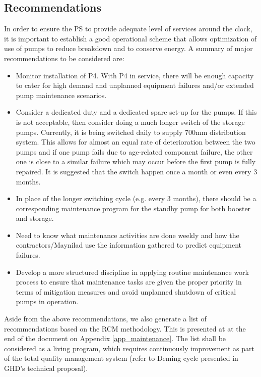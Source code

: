 \subsection{Recommendations}
In order to ensure the PS to provide adequate level of services around the clock, it is important to establish a good operational scheme that allows optimization of use of pumps to reduce breakdown and to conserve energy. A summary of major recommendations to be considered are:

\begin{itemize}

	\item Monitor installation of P4.  With P4 in service, there will be enough capacity to cater for high demand and unplanned equipment failures and/or extended pump maintenance scenarios.
	
	\item Consider a dedicated duty and a dedicated spare set-up for the pumps.  If this is not acceptable, then consider doing a much longer switch of the storage pumps.  Currently, it is being switched daily to supply 700mm distribution system.  This allows for almost an equal rate of deterioration between the two pumps and if one pump fails due to age-related component failure, the other one is close to a similar failure which may occur before the first pump is fully repaired.  It is suggested that the switch happen once a month or even every 3 months.
	
	\item In place of the longer switching cycle (e.g. every 3 months), there should be a corresponding maintenance program for the standby pump for both booster and storage.
	
	\item Need to know what maintenance activities are done weekly and how the contractors/Maynilad use the information gathered to predict equipment failures.  
	
	\item Develop a more structured discipline in applying routine maintenance work process to ensure that maintenance tasks are given the proper priority in terms of mitigation measures and avoid unplanned shutdown of critical pumps in operation.
		
\end{itemize}

Aside from the above recommendations, we also generate a list of recommendations based on the RCM methodology. This is presented at at the end of the document on Appendix  \ref{app_maintenance}. The list shall be considered as a living program, which requires continuously improvement as part of the total quality management system (refer to Deming cycle presented in GHD's technical proposal).

%